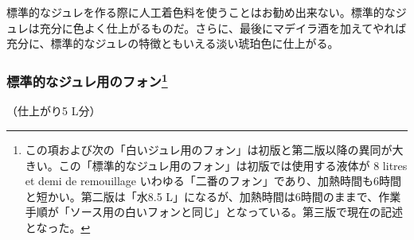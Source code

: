 標準的なジュレを作る際に人工着色料を使うことはお勧め出来ない。標準的なジュレは充分に色よく仕上がるものだ。さらに、最後にマデイラ酒を加えてやれば充分に、標準的なジュレの特徴ともいえる淡い琥珀色に仕上がる。
\begin{recette}
\hypertarget{fonds-pour-gelee-ordinaire}{%
\subsubsection[標準的なジュレ用のフォン]{\texorpdfstring{標準的なジュレ用のフォン\footnote{この項および次の「白いジュレ用のフォン」は初版と第二版以降の異同が大きい。この「標準的なジュレ用のフォン」は初版では使用する液体が
  8 litres et demi de remouillage
  いわゆる「二番のフォン」であり、加熱時間も6時間と短かい。第二版は「水8.5
  L」になるが、加熱時間は6時間のままで、作業手順が「ソース用の白いフォンと同じ」となっている。第三版で現在の記述となった。}}{標準的なジュレ用のフォン}}\label{fonds-pour-gelee-ordinaire}}



（仕上がり5 L分）


\end{recette}
